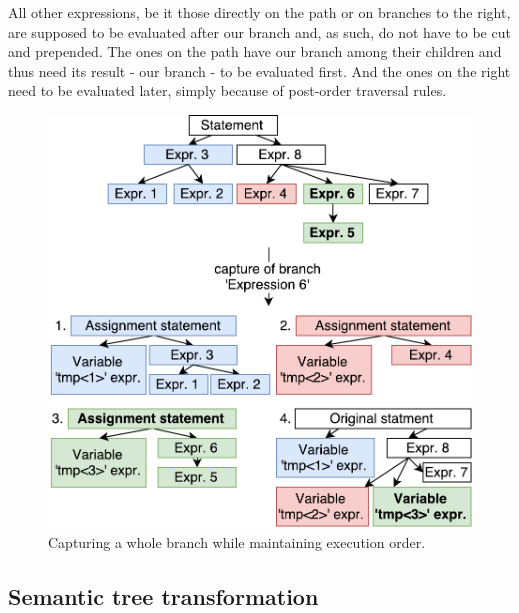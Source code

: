 All other expressions, be it those directly on the path or on branches to the right, are supposed to be evaluated after our branch and, as such, do not have to be cut and prepended. The ones on the path have our branch among their children and thus need its result - our branch - to be evaluated first. And the ones on the right need to be evaluated later, simply because of post-order traversal rules. 

\begin{figure}[h]
	\centering	
	\includegraphics[scale=0.75]{../img/5_2_captureAllOnPath}	
	\caption{Capturing a whole branch while maintaining execution order.}
	\label{fig5.2:CaptureAllBranch}
\end{figure}

\subsection{Semantic tree transformation}

